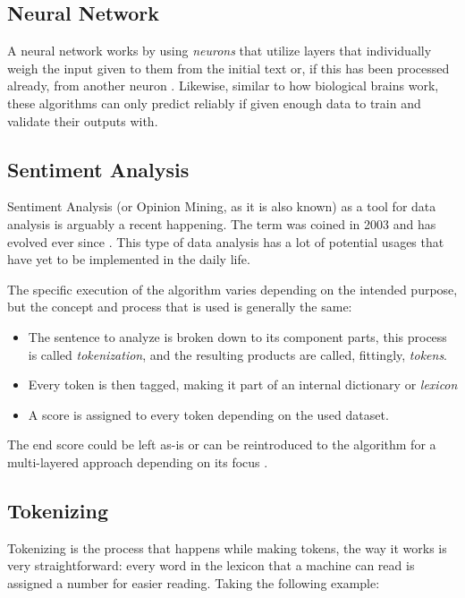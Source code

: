 \documentclass[review]{elsarticle} %
\begin{document}
\subsection{Neural Network}
A neural network works by using \textit{neurons} that utilize layers that individually weigh the input given to them from the initial text or, if this has been processed already, from another neuron \citep{rf9}.
Likewise, similar to how biological brains work, these algorithms can only predict reliably if given enough data to train and validate their outputs with.

\subsection{Sentiment Analysis}
Sentiment Analysis (or Opinion Mining, as it is also known) as a tool for data analysis is arguably a recent happening. The term was coined in 2003 and has evolved ever since \citep{rf3}.
This type of data analysis has a lot of potential usages that have yet to be implemented in the daily life.

The specific execution of the algorithm varies depending on the intended purpose, but the concept and process that is used is generally the same:
\begin{itemize}
	\item The sentence to analyze is broken down to its component parts, this process is called \textit{tokenization}, and the resulting products are called, fittingly, \textit{tokens}.
	\item Every token is then tagged, making it part of an internal dictionary or \textit{lexicon}
	\item A score is assigned to every token depending on the used dataset.
\end{itemize}
The end score could be left as-is or can be reintroduced to the algorithm for a multi-layered approach depending on its focus \citep{rf4}.

\subsection{Tokenizing}
Tokenizing is the process that happens while making tokens, the way it works is very straightforward: every word in the lexicon that a machine can read is assigned a number for easier reading. Taking the following example:
\begin{center}
\end{center}
\end{document}
